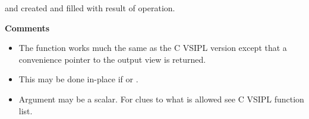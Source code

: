 \hspace*{.1\textwidth} and  created and filled with result of operation.
\\\begin{minipage}{\textwidth}
\hspace*{.04\textwidth}\textbf{Comments}\\ 
\hspace*{.04\textwidth}\parbox{.95\textwidth}
{\vspace*{.1cm}
\begin{itemize}
\item{The  function works much the same as the C VSIPL version except that a convenience pointer to the output view is returned.}
\item{This may be done in-place if  or .}
\item{Argument  may be a scalar. For clues to what is allowed see C VSIPL function list.}
\end{itemize}
}
\end{minipage}